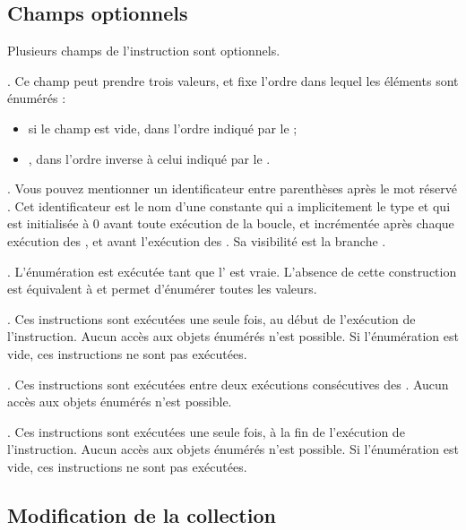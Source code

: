 {\subsection{Champs optionnels}

Plusieurs champs de l'instruction  sont optionnels.


. Ce champ peut prendre trois valeurs, et fixe l'ordre dans lequel les éléments sont énumérés :
\begin{itemize}
  \item si le champ est vide, dans l'ordre indiqué par le  ;
  \item \galgas{>}, dans l'ordre inverse à celui indiqué par le .
\end{itemize}


. Vous pouvez mentionner un identificateur entre parenthèses après le mot réservé . Cet identificateur est le nom d'une constante qui a implicitement le type  et qui est initialisée à 0 avant toute exécution de la boucle, et incrémentée après chaque exécution des , et avant l'exécution des . Sa visibilité est la branche .

. L'énumération est exécutée tant que l' est vraie. L'absence de cette construction est équivalent à  et permet d'énumérer toutes les valeurs.


. Ces instructions sont exécutées une seule fois, au début de l'exécution de l'instruction. Aucun accès aux objets énumérés n'est possible. Si l'énumération est vide, ces instructions ne sont pas exécutées.

. Ces instructions sont exécutées entre deux exécutions consécutives des . Aucun accès aux objets énumérés n'est possible.

. Ces instructions sont exécutées une seule fois, à la fin de l'exécution de l'instruction. Aucun accès aux objets énumérés n'est possible. Si l'énumération est vide, ces instructions ne sont pas exécutées.


\subsection{Modification de la collection}

}

